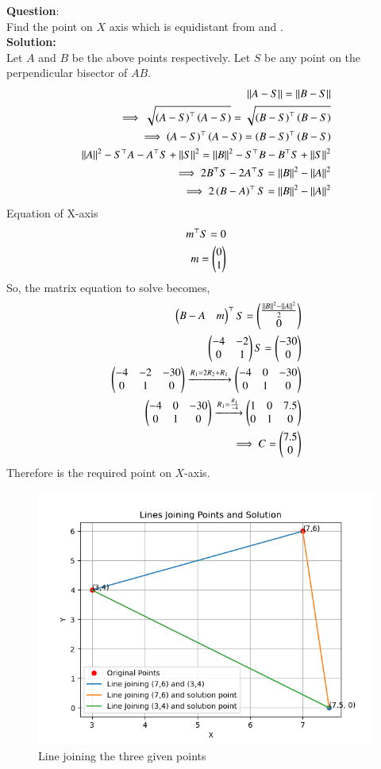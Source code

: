 \documentclass[journal]{IEEEtran}
\begin{document}
\textbf{Question}:\\
Find the point on $X$ axis which is equidistant from  and .
\\
\textbf{Solution: }\\
Let $A$ and $B$ be the above points respectively.
Let $S$ be any point on the perpendicular bisector of $AB$.
\begin{align} 
    ||A-S|| = ||B-S||\\
    \implies \sqrt{\left(A-S\right)^\top \left(A-S\right)} =  \sqrt{\left(B-S\right)^\top \left(B-S\right)} \\
    \implies  \left(A-S\right)^\top \left(A-S\right) = \left(B-S\right)^\top \left(B-S\right) \\
    ||A||^2 - S^\top A - A^\top S + ||S||^2 =  ||B||^2 - S^\top B - B^\top S + ||S||^2 \\
    \implies 2B^\top S - 2A^\top S = ||B||^2 - ||A||^2\\
    \implies 2\left(B-A\right)^\top S = ||B||^2 - ||A||^2 \\
\end{align}
Equation of X-axis
\begin{align}
    m^\top S = 0\\
    m = \begin{pmatrix}0 \\ 1\end{pmatrix}
\end{align}
So, the matrix equation to solve becomes,
\begin{align}
    \begin{pmatrix}B-A &  m\end{pmatrix}^\top S = \begin{pmatrix}\frac{||B||^2 - ||A||^2}{2}\\ 0\end{pmatrix}\\
    \begin{pmatrix}-4 & -2 \\0 & 1\end{pmatrix}S = \begin{pmatrix}-30 \\ 0\end{pmatrix}\\
    \begin{pmatrix}-4 & -2 & -30 \\ 0 & 1 & 0\end{pmatrix} \xrightarrow{R_1 = 2R_2 + R_1 } \begin{pmatrix}-4 & 0 & -30 \\ 0 & 1 & 0\end{pmatrix}\\
    \begin{pmatrix}-4 & 0 & -30 \\ 0 & 1 & 0\end{pmatrix} \xrightarrow{R_1 = \frac{R_1}{-4}}
    \begin{pmatrix}1 & 0 & 7.5 \\ 0 & 1 & 0\end{pmatrix}\\
    \implies C = \begin{pmatrix}7.5\\0\end{pmatrix}\\
\end{align}
Therefore  is the required point on $X$-axis.    
\begin{figure}[h!]
   \centering
   \includegraphics[width=0.7\linewidth]{figs/fig.png}
   \caption{Line joining the three given points}
\end{figure}
\end{document}
